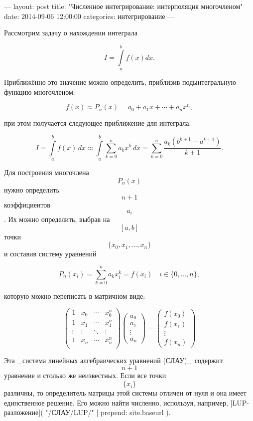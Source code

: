 ---
layout: post
title:  "Численное интегрирование: интерполяция многочленом"
date:   2014-09-06 12:00:00
categories: интегрирование
---

Рассмотрим задачу о нахождении интеграла

$$
    I = \int\limits_a^b f(x) dx.
$$

Приближённо это значение можно определить, приблизив подынтегральную функцию
многочленом:

$$
    f(x) \approx P_n(x) = a_0 + a_1 x + \cdots + a_n x^n,
$$

при этом получается следующее приближение для интеграла:

$$
    I = \int\limits_a^b f(x)\,dx \approx
    \int\limits_a^b\sum_{k=0}^n a_k x^k\,dx =
    \sum_{k=0}^n \frac{a_k(b^{k+1} - a^{k+1})}{k+1}.
$$

Для построения многочлена $$ P_n(x) $$ нужно определить $$ n+1 $$ коэффициентов
$$ a_i $$. Их можно определить, выбрав на $$ [a, b] $$ точки
$$ \{ x_0, x_1, \ldots, x_n \} $$ и составив систему уравнений

$$
  P_n(x_i) = \sum_{k=0}^n a_k x_i^k = f(x_i) \quad i\in\{0,\ldots,n\},
$$

которую можно переписать в матричном виде:

$$
    \begin{pmatrix}
        1 & x_0 & \cdots & x_0^n \\
        1 & x_1 & \cdots & x_1^n \\
        \vdots & \vdots & \ddots & \vdots \\
        1 & x_n & \cdots & x_n^n \\
    \end{pmatrix}
    \begin{pmatrix}
    a_0 \\ a_1 \\ \vdots \\ a_n
    \end{pmatrix}
    =
    \begin{pmatrix}
    f(x_0) \\ f(x_1) \\ \vdots \\ f(x_n)
    \end{pmatrix}
$$

Эта _система линейных алгебраических уравнений (СЛАУ)_ содержит $$ n + 1 $$
уравнение и столько же неизвестных. Если все точки $$ \{x_i\} $$ различны, то
определитель матрицы этой системы отличен от нуля и она имеет единственное
решение. Его можно найти численно, используя, например,
[LUP-разложение]({{ "/СЛАУ/LUP/" | prepend: site.baseurl }}).

